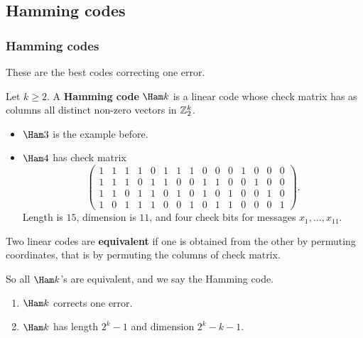 \subsection{Hamming codes}

\subsubsection{Hamming codes}


These are the best codes correcting one error.

\begin{definition*}
Let $ k \ge 2 $. A \textbf{Hamming code} $ \Ham k $ is a linear code whose check matrix has as columns all distinct non-zero vectors in $ \mathbb{Z}_2^k $.
\end{definition*}

\setcounter{MaxMatrixCols}{15}

\begin{example*}
\hfill
\begin{itemize}
\item $ \Ham 3 $ is the example before.
\item $ \Ham 4 $ has check matrix
$$
\begin{pmatrix}
1 & 1 & 1 & 1 & 0 & 1 & 1 & 1 & 0 & 0 & 0 & 1 & 0 & 0 & 0 \\
1 & 1 & 1 & 0 & 1 & 1 & 0 & 0 & 1 & 1 & 0 & 0 & 1 & 0 & 0 \\
1 & 1 & 0 & 1 & 1 & 0 & 1 & 0 & 1 & 0 & 1 & 0 & 0 & 1 & 0 \\
1 & 0 & 1 & 1 & 1 & 0 & 0 & 1 & 0 & 1 & 1 & 0 & 0 & 0 & 1
\end{pmatrix}.
$$
Length is $ 15 $, dimension is $ 11 $, and four check bits for messages $ x_1, \dots, x_{11} $.
\end{itemize}
\end{example*}

\pagebreak

\setcounter{MaxMatrixCols}{10}

\begin{definition*}
Two linear codes are \textbf{equivalent} if one is obtained from the other by permuting coordinates, that is by permuting the columns of check matrix.
\end{definition*}

So all $ \Ham k $'s are equivalent, and we say the Hamming code.

\begin{proposition}
\label{prop:1.7}
\hfill
\begin{enumerate}
\item $ \Ham k $ corrects one error.
\item $ \Ham k $ has length $ 2^k - 1 $ and dimension $ 2^k - k - 1 $.
\end{enumerate}
\end{proposition}


